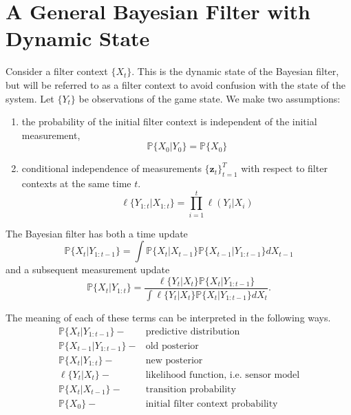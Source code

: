 \documentclass[11pt]{article}
\newcommand\obs[1]{\bm{z}_{#1}}
\newcommand\prob[1]{\mathbb{P}{\{#1\}}}
\newcommand\lkhd[1]{\ell{\{#1\}}}
\newcommand\horizon{T}
\begin{document}
\section{A General Bayesian Filter with Dynamic State}
Consider a filter context $\{ X_t \}$. This is the dynamic state of the Bayesian filter, but will be referred to as a filter context to avoid confusion with the state of the system. Let $\{ Y_t \}$ be observations of the game state. We make two assumptions:
\begin{enumerate}
\item the probability of the initial filter context is independent of the initial measurement,
\begin{equation}
\label{eq:indep-init-context}
\prob{X_0 | Y_0} = \prob{X_0}
\end{equation}

\item conditional independence of measurements $\{\obs{t}\}_{t=1}^\horizon$ with respect to filter contexts at the same time $t$.
\begin{equation}
\label{eq:cond-indep-of-meas-wrt-state}
\lkhd{Y_{1:t} | X_{1:t}} = \prod_{i=1}^t \ell(Y_i | X_i)
\end{equation}
\end{enumerate}

The Bayesian filter has both a time update
\begin{equation}
\label{eq:time-update}
\prob{X_t | Y_{1:t-1}} = \int \prob{X_t | X_{t-1}} \prob{X_{t-1} | Y_{1:t-1}} dX_{t-1}
\end{equation}
and a subsequent measurement update
\begin{equation}
\label{eq:meas-update}
\prob{X_t | Y_{1:t}} = \frac{\lkhd{Y_t | X_t} \prob{X_t | Y_{1:t-1}}}{\int \lkhd{Y_t | X_t} \prob{X_t | Y_{1:t-1}}  dX_t}.
\end{equation}

The meaning of each of these terms can be interpreted in the following ways.
\begin{align*}
\prob{X_t | Y_{1:t-1}} - &\text{predictive distribution} \\
\prob{X_{t-1} | Y_{1:t-1}} - &\text{old posterior} \\
\prob{X_t | Y_{1:t}} - &\text{new posterior} \\
\lkhd{Y_t | X_t} - &\text{likelihood function, i.e. sensor model} \\
\prob{X_t | X_{t-1}} - &\text{transition probability} \\
\prob{X_0} - &\text{initial filter context probability}
\end{align*}
\end{document}
